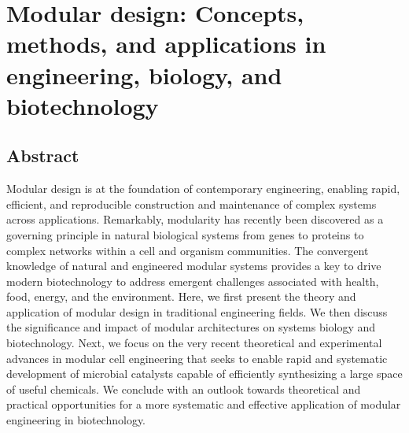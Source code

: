 \chapter{Modular design: Concepts, methods, and applications in engineering, biology, and biotechnology}\label{ch:review}




%
%

\section*{Abstract}

Modular design is at the foundation of contemporary engineering, enabling rapid, efficient, and reproducible construction and maintenance of complex systems across applications.
Remarkably, modularity has recently been discovered as a governing principle in natural biological systems from genes to proteins to complex networks within a cell and organism communities.
The convergent knowledge of natural and engineered modular systems provides a key to drive modern biotechnology to address emergent challenges associated with health, food, energy, and the environment.
Here, we first present the theory and application of modular design in traditional engineering fields.
We then discuss the significance and impact of modular architectures on systems biology and biotechnology.
Next, we focus on the very recent theoretical and experimental advances in modular cell engineering that seeks to enable rapid and systematic development of microbial catalysts capable of efficiently synthesizing a large space of useful chemicals.
We conclude with an outlook towards theoretical and practical opportunities for a more systematic and effective application of modular engineering in biotechnology.

